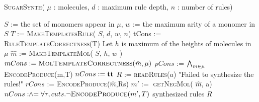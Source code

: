 \begin{algorithm}[t]
  \caption{ \textsc{SugarSynth}( $\mu$ : molecules, $d$ : maximum rule depth, $n$ : number of rules)}
  \label{alg:sugar-synth}
  \begin{algorithmic}[1]
  \State $S$ := the set of monomers appear in $\mu$, $w$ := the maximum arity of a monomer in $S$
  \State $T$ := \textsc{MakeTemplatesRule}( $S$, $d$, $w$, $n$)
  \label{line:createRtemp}
  \State tCons := \textsc{RuleTemplateCorrectness}(T)
  \label{line:ruleCorr}
  \State Let $h$ is maximum of the heights of molecules in $\mu$
  \State $\hat{m}$ := \textsc{MakeTemplateMol}( $S$, $h$, $w$ )
  \label{line:createMtemp}
  \State $mCons := \textsc{MolTemplateCorrectness}(\hat{m},\mu)$
  \label{line:molCorr}
  \State $pCons$ := $\bigwedge_{m \in \mu}$ \textsc{EncodeProduce}(m,T)
    \label{line:molenc}
  \State $nCons := \mathbf{tt}$
  \While{$\ltrue$}
    \label{line:posModel}
    \State $R$ := \textsc{readRules}($a$)
    \label{line:getR}
    \Else
       \State \Return "Failed to synthesize the rules!"
    \EndIf
    \State $rCons$ := \textsc{EncodeProduce}($\hat{m}$,Rs)
    \label{line:consNewR}
        \label{line:negModel}
        \State $m' :=$ \textsc{getNegMol}( $\hat{m}$, a)
        \State $nCons \mathrel{:\hspace{-3pt}\land\hspace{-3pt}=} \forall \tau,cuts. \lnot \textsc{EncodeProduce}(m',T)$
        \label{line:encode-neg-mol}
        \label{line:negCons}
    \Else
       \State \Return synthesized rules $R$
    \EndIf

  \EndWhile
\end{algorithmic}
\end{algorithm}


